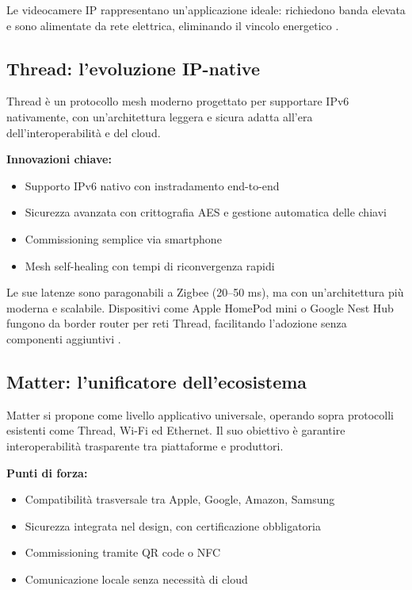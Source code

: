 Le videocamere IP rappresentano un'applicazione ideale: richiedono banda elevata e sono alimentate da rete elettrica, eliminando il vincolo energetico \cite{WiFiVsIoT}.

\subsection{Thread: l'evoluzione IP-native}

Thread è un protocollo mesh moderno progettato per supportare IPv6 nativamente, con un’architettura leggera e sicura adatta all’era dell’interoperabilità e del cloud.

\textbf{Innovazioni chiave:}
\begin{itemize}
    \item Supporto IPv6 nativo con instradamento end-to-end
    \item Sicurezza avanzata con crittografia AES e gestione automatica delle chiavi
    \item Commissioning semplice via smartphone
    \item Mesh self-healing con tempi di riconvergenza rapidi
\end{itemize}

Le sue latenze sono paragonabili a Zigbee (20–50 ms), ma con un’architettura più moderna e scalabile. Dispositivi come Apple HomePod mini o Google Nest Hub fungono da border router per reti Thread, facilitando l’adozione senza componenti aggiuntivi \cite{thread-spec}.

\subsection{Matter: l’unificatore dell’ecosistema}

Matter si propone come livello applicativo universale, operando sopra protocolli esistenti come Thread, Wi-Fi ed Ethernet. Il suo obiettivo è garantire interoperabilità trasparente tra piattaforme e produttori.

\textbf{Punti di forza:}
\begin{itemize}
    \item Compatibilità trasversale tra Apple, Google, Amazon, Samsung
    \item Sicurezza integrata nel design, con certificazione obbligatoria
    \item Commissioning tramite QR code o NFC
    \item Comunicazione locale senza necessità di cloud
\end{itemize}


